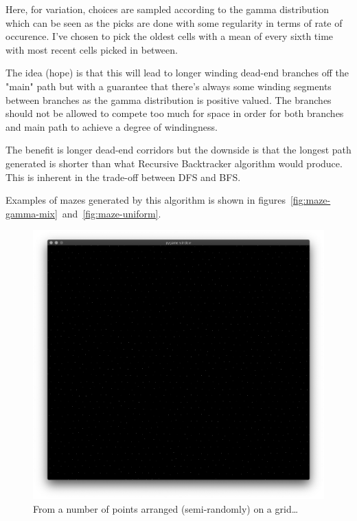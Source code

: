 \documentclass[a4paper,12pt]{article}
\begin{document}
Here, for variation, choices are sampled according to the gamma distribution
which can be seen as the picks are done with some regularity in terms
of rate of occurence. I've chosen to pick the oldest cells with a mean
of every sixth time with most recent cells picked in between.

The idea (hope) is that this will lead to longer winding dead-end branches
off the "main" path but with a guarantee that there's always some winding
segments between branches as the gamma distribution is positive valued.
The branches should not be allowed to compete too much for space in order
for both branches and main path to achieve a degree of windingness.

The benefit is longer dead-end corridors but the downside is that the
longest path generated is shorter than what Recursive Backtracker algorithm
would produce. This is inherent in the trade-off between DFS and BFS.

Examples of mazes generated by this algorithm is shown in
figures~\ref{fig:maze-gamma-mix}~and~\ref{fig:maze-uniform}.


\begin{figure}[ht]
  \centering
  \includegraphics[width=\linewidth]{images/dots.png}
  \caption{From a number of points arranged (semi-randomly) on a grid…
  \label{fig:dots}}
\end{figure}
\end{document}

